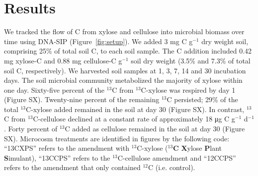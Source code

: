\section{Results}
We tracked the flow of C from xylose and cellulose into microbial biomass over
time using DNA-SIP (Figure~\ref{fig:setup}). We added 3 mg C g$^{-1}$ dry
weight soil, comprising 25\% of total soil C, to each soil sample. The C
addition included 0.42 mg xylose-C and 0.88 mg cellulose-C g$^{-1}$ soil
dry weight (3.5\% and 7.3\% of total soil C, respectively). We harvested
soil samples at 1, 3, 7, 14 and 30 incubation days. The soil microbial
community metabolized the majority of xylose within one day. Sixty-five
percent of the $^{13}$C from $^{13}$C-xylose was respired by day 1 (Figure
SX). Twenty-nine percent of the remaining $^{13}$C persisted; 29\% of the
total $^{13}$C-xylose added remained in the soil at day 30 (Figure SX). In
contrast, $^{13}$C from $^{13}$C-cellulose declined at a constant rate of
approximately 18 μg C g$^{-1}$ d$^{-1}$. Forty percent of $^{13}$C added
as cellulose remained in the soil at day 30 (Figure SX). Microcosm
treatments are identified in figures by the following code: ``13CXPS''
refers to the amendment with $^{13}$C-xylose ($^{13}$\textbf{C}
\textbf{X}ylose \textbf{P}lant \textbf{S}imulant), ``13CCPS'' refers to
the $^{13}$C-cellulose amendment and ``12CCPS'' refers to the amendment
that only contained $^{12}$C (i.e. control).

